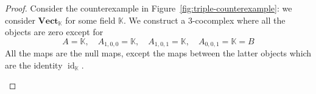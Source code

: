 \documentclass[a4paper]{article}
\begin{document}
\begin{proof}
    Consider the counterexample in Figure~\ref{fig:triple-counterexample}: we consider \(\mathbf{Vect}_{\mathbb K}\) for some field \(\mathbb K\).
    We construct a \(3\)-cocomplex where all the objects are zero except for
    \[
        A = \mathbb K, \quad A_{1,0,0} = \mathbb K, \quad A_{1,0,1} = \mathbb K, \quad A_{0,0,1} = \mathbb K = B
    \]
    All the maps are the null maps, except the maps
    between the latter objects which are the identity \(\operatorname{id}_{\mathbb K}\).

    \begin{center}
    \begin{minipage}{0.45\textwidth}
\end{minipage}
\end{center}
\end{proof}
\end{document}
